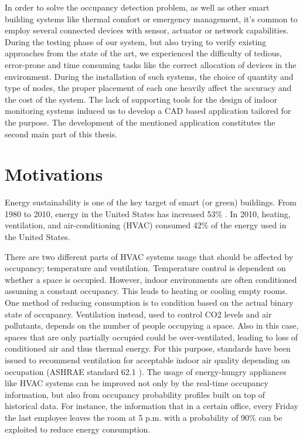 In order to solve the occupancy detection problem, as well as other smart building systems like thermal comfort or emergency management, it's common to employ several connected devices with sensor, actuator or network capabilities. During the testing phase of our system, but also trying to verify existing approaches from the state of the art, we experienced the difficulty of tedious, error-prone and time consuming tasks like the correct allocation of devices in the environment. During the installation of such systems, the choice of quantity and type of nodes, the proper placement of each one heavily affect the accuracy and the cost of the system. The lack of supporting tools for the design of indoor monitoring systems induced us to develop a CAD based application tailored for the purpose. The development of the mentioned application constitutes the second main part of this thesis.




%
\section{Motivations}
Energy sustainability is one of the key target of smart (or green) buildings.
From 1980 to 2010, energy in the United States has increased 53\% \cite{doe}. In 2010, heating, ventilation, and air-conditioning (HVAC) consumed 42\% of the energy used in the United States.

There are two different parts of HVAC systems usage that should be affected by occupancy; temperature and ventilation.
Temperature control is dependent on whether a space is occupied. However, indoor environments are often conditioned assuming a constant occupancy. This leads to heating or cooling empty rooms. One method of reducing consumption is to condition based on the actual binary state of occupancy.
Ventilation instead, used to control CO2 levels and air pollutants, depends on the number of people occupying a space. Also in this case, spaces that are only partially occupied could be over-ventilated, leading to loss of conditioned air and thus thermal energy. For this purpose, standards have been issued to recommend ventilation for acceptable indoor air quality depending on occupation (ASHRAE standard 62.1 \cite{ashrae}).
The usage of energy-hungry appliances like HVAC systems can be improved not only by the real-time occupancy information, but also from occupancy probability profiles built on top of historical data. For instance, the information that in a certain office, every Friday the last employee leaves the room at 5 p.m. with a probability of 90\% can be exploited to reduce energy consumption.

